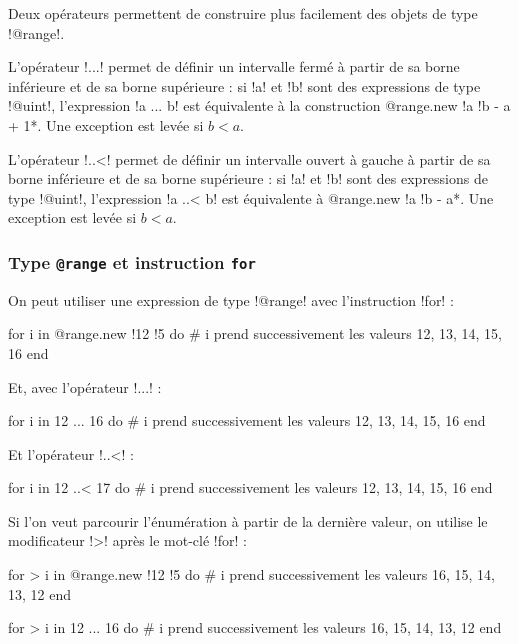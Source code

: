 
Deux opérateurs permettent de construire plus facilement des objets de type \ggs!@range!.

L'opérateur \ggs!...! permet de définir un intervalle fermé à partir de sa borne inférieure et de sa borne supérieure : si \ggs!a! et \ggs!b! sont des expressions de type \ggs!@uint!, l'expression \ggs!a ... b! est équivalente à la construction \ggs*@range.new {!a !b - a + 1}*. Une exception est levée si $b < a$. 

L'opérateur \ggs!..<! permet de définir un intervalle ouvert à gauche à partir de sa borne inférieure et de sa borne supérieure : si \ggs!a! et \ggs!b! sont des expressions de type \ggs!@uint!, l'expression \ggs!a ..< b! est équivalente à \ggs*@range.new {!a !b - a}*. Une exception est levée si $b < a$.

\subsubsection{Type \texttt{@range} et instruction \texttt{for}}

On peut utiliser une expression de type \ggs!@range! avec l'instruction \ggs!for! :

\begin{galgas}
for i in @range.new {!12 !5} do
  # i prend successivement les valeurs 12, 13, 14, 15, 16
end
\end{galgas}

Et, avec l'opérateur \ggs!...! :
\begin{galgas}
for i in 12 ... 16 do
  # i prend successivement les valeurs 12, 13, 14, 15, 16
end
\end{galgas}

Et l'opérateur \ggs!..<! :
\begin{galgas}
for i in 12 ..< 17 do
  # i prend successivement les valeurs 12, 13, 14, 15, 16
end
\end{galgas}

Si l'on veut parcourir l'énumération à partir de la dernière valeur, on utilise le modificateur \ggs!>! après le mot-clé \ggs!for! :
\begin{galgas}
for > i in @range.new {!12 !5} do
  # i prend successivement les valeurs 16, 15, 14, 13, 12
end
\end{galgas}
 
\begin{galgas}
for > i in 12 ... 16 do
  # i prend successivement les valeurs 16, 15, 14, 13, 12
end
\end{galgas}
 
